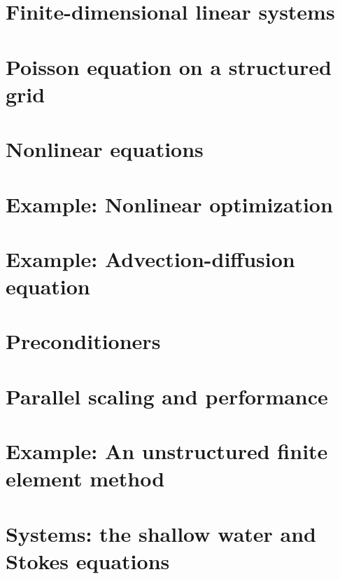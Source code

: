 \documentclass{tufte-book}
\newcommand{\CODELOC}{}  %
\newcommand{\stubinput}[2]{}
\newcommand{\stubinput}[2]{\vspace{5cm} \centerline{\LARGE Percent completed:  \Huge #2\%.} \vfill}
\theoremstyle{definition}
\begin{document}
\chapter{Finite-dimensional linear systems}
\label{chap:ls}
\renewcommand{\CODELOC}{ch2/}


\chapter{Poisson equation on a structured grid}
\label{chap:st}
\renewcommand{\CODELOC}{ch3/}


\chapter{Nonlinear equations}
\label{chap:nl}
\renewcommand{\CODELOC}{ch4/}


\chapter{Example: Nonlinear optimization}
\label{chap:of}
\renewcommand{\CODELOC}{ch5/}


\chapter{Example: Advection-diffusion equation}
\label{chap:ad}
\renewcommand{\CODELOC}{ch6/}


\chapter{Preconditioners}
\label{chap:pr}
\renewcommand{\CODELOC}{ch7/}


\chapter{Parallel scaling and performance}
\label{chap:sc}
\renewcommand{\CODELOC}{ch8/}
\stubinput{scaling.tex}{5}

\chapter{Example: An unstructured finite element method}
\label{chap:un}
\renewcommand{\CODELOC}{ch9/}


\chapter{Systems: the shallow water and Stokes equations}
\label{chap:sy}
\renewcommand{\CODELOC}{ch10/}
\stubinput{stokes.tex}{5}
\end{document}
